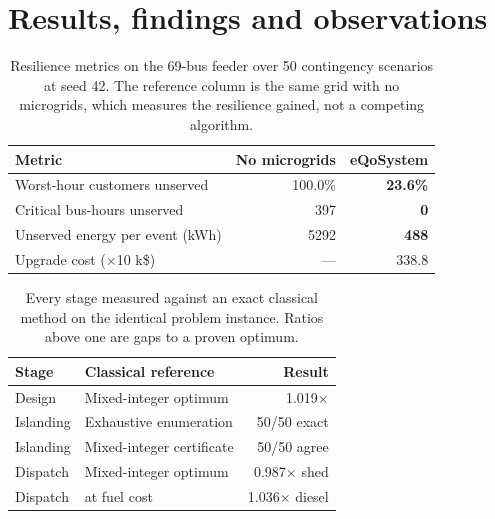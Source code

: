 \documentclass[11pt,twocolumn]{article}
\begin{document}
\section{Results, findings and observations}
\begin{table}[t]\centering\small
\caption{Resilience metrics on the 69-bus feeder over 50
contingency scenarios at seed 42. The reference column is the same grid with no
microgrids, which measures the resilience gained, not a competing algorithm.}
\label{tab:metrics}
\begin{tabular}{@{}lrr@{}}\toprule
Metric & No microgrids & eQoSystem\\\midrule
Worst-hour customers unserved & 100.0\% & \textbf{23.6\%}\\
Critical bus-hours unserved & 397 & \textbf{0}\\
Unserved energy per event (kWh) & 5292 & \textbf{488}\\
Upgrade cost ($\times$10 k\$) & --- & 338.8\\
\bottomrule\end{tabular}\end{table}

\begin{table}[t]\centering\small
\caption{Every stage measured against an exact classical method on the identical
problem instance. Ratios above one are gaps to a proven optimum.}
\label{tab:baselines}
\begin{tabular}{@{}llr@{}}\toprule
Stage & Classical reference & Result\\\midrule
Design & Mixed-integer optimum & 1.019$\times$\\
Islanding & Exhaustive enumeration & 50/50 exact\\
Islanding & Mixed-integer certificate & 50/50 agree\\
Dispatch & Mixed-integer optimum & 0.987$\times$ shed\\
Dispatch & \quad at fuel cost & 1.036$\times$ diesel\\
\bottomrule\end{tabular}\end{table}
\end{document}
